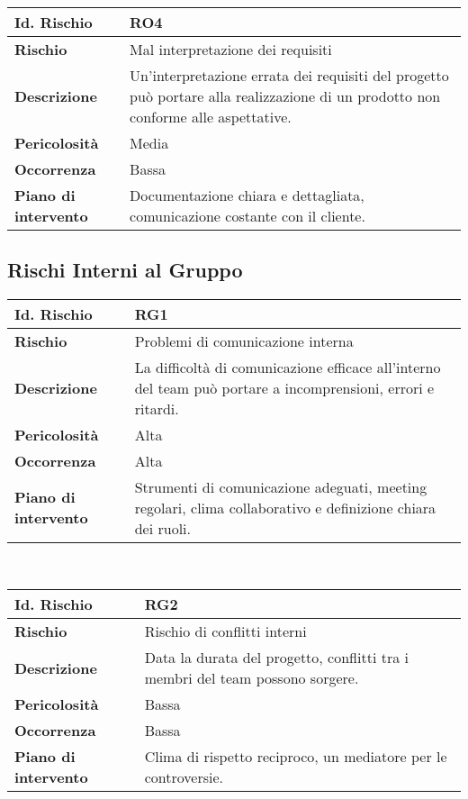 \\[30pt]
\hypertarget{RO4}{}
\begin{tabular}{|L{4cm}|L{9.7cm}|}
    \hline
    \textbf{Id. Rischio} & \textbf{RO4} \\
    \hline
    \textbf{Rischio} & Mal interpretazione dei requisiti \\
    \hline
    \textbf{Descrizione} & Un'interpretazione errata dei requisiti del progetto può portare alla realizzazione di un prodotto non conforme alle aspettative. \\
    \hline
    \textbf{Pericolosità} & Media \\
    \hline
    \textbf{Occorrenza} & Bassa \\
    \hline
    \textbf{Piano di intervento} & Documentazione chiara e dettagliata, comunicazione costante con il cliente. \\
    \hline
\end{tabular}

\subsection{Rischi Interni al Gruppo}

\hypertarget{RG1}{}
\begin{tabular}{|L{4cm}|L{9.7cm}|}
    \hline
    \textbf{Id. Rischio} & \textbf{RG1} \\
    \hline
    \textbf{Rischio} & Problemi di comunicazione interna \\
    \hline
    \textbf{Descrizione} & La difficoltà di comunicazione efficace all'interno del team può portare a incomprensioni, errori e ritardi. \\
    \hline
    \textbf{Pericolosità} & Alta \\
    \hline
    \textbf{Occorrenza} & Alta \\
    \hline
    \textbf{Piano di intervento} & Strumenti di comunicazione adeguati, meeting regolari, clima collaborativo e definizione chiara dei ruoli. \\
    \hline
\end{tabular}
\\[30pt]
\hypertarget{RG2}{}
\begin{tabular}{|L{4cm}|L{9.7cm}|}
    \hline
    \textbf{Id. Rischio} & \textbf{RG2} \\
    \hline
    \textbf{Rischio} & Rischio di conflitti interni \\
    \hline
    \textbf{Descrizione} & Data la durata del progetto, conflitti tra i membri del team possono sorgere. \\
    \hline
    \textbf{Pericolosità} & Bassa \\
    \hline
    \textbf{Occorrenza} & Bassa \\
    \hline
    \textbf{Piano di intervento} & Clima di rispetto reciproco, un mediatore per le controversie. \\
    \hline
\end{tabular}